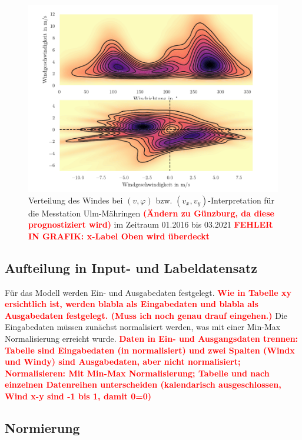 \documentclass[
12pt, %
toc=listofnumbered, %
toc=chapterentrydotfill, %
numbers=noenddot, %
captions=tableheading, %
bibliography=numbered
]{scrreprt}
\let\Oldsubsection\subsection
\renewcommand{\subsection}{\FloatBarrier\Oldsubsection}
\newcommand{\highlight}[1]{\textbf{\textcolor{red}{#1}}}
\begin{document}
\begin{figure}[tph]
	\begin{center}
		\includegraphics[scale = 1]{./images/pol2cart_visualize.pdf}
		\caption{Verteilung des Windes bei $(v,\varphi)$ bzw. $(v_x,v_y)$-Interpretation für die Messtation Ulm-Mähringen \highlight{(Ändern zu Günzburg, da diese prognostiziert wird)} im Zeitraum 01.2016 bis 03.2021 \highlight{FEHLER IN GRAFIK: x-Label Oben wird überdeckt}}
		\label{fig:pol2cart2}
	\end{center}
\end{figure}

\subsection{Aufteilung in Input- und Labeldatensatz}
Für das Modell werden Ein- und Ausgabedaten festgelegt. \highlight{Wie in Tabelle xy ersichtlich ist, werden blabla als Eingabedaten und blabla als Ausgabedaten festgelegt. (Muss ich noch genau drauf eingehen.)} Die Eingabedaten müssen zunächst normalisiert werden, was mit einer Min-Max Normalisierung erreicht wurde.
\highlight{Daten in Ein- und Ausgangsdaten trennen: Tabelle sind Eingabedaten (in normalisiert) und zwei Spalten (Windx und Windy) sind Ausgabedaten, aber nicht normalisiert; 
Normalisieren: Mit  Min-Max Normalisierung; Tabelle und nach einzelnen Datenreihen unterscheiden (kalendarisch ausgeschlossen, Wind x-y sind -1 bis 1, damit 0=0)}

\subsection{Normierung}
\end{document}
